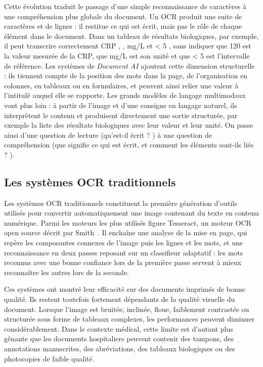 Cette évolution traduit le passage d'une simple reconnaissance de caractères à une compréhension plus globale du document. Un OCR produit une suite de caractères et de lignes : il restitue ce qui est écrit, mais pas le rôle de chaque élément dans le document. Dans un tableau de résultats biologiques, par exemple, il peut transcrire correctement \og CRP \fg{},  \fg{}, \og mg/L \fg{} et \og < 5 \fg{}, sans indiquer que 120 est la valeur mesurée de la CRP, que mg/L est son unité et que < 5 est l'intervalle de référence. Les systèmes de \textit{Document AI} ajoutent cette dimension structurelle : ils tiennent compte de la position des mots dans la page, de l'organisation en colonnes, en tableaux ou en formulaires, et peuvent ainsi relier une valeur à l'intitulé auquel elle se rapporte. Les grands modèles de langage multimodaux vont plus loin : à partir de l'image et d'une consigne en langage naturel, ils interprètent le contenu et produisent directement une sortie structurée, par exemple la liste des résultats biologiques avec leur valeur et leur unité. On passe ainsi d'une question de lecture (\og qu'est-il écrit ? \fg{}) à une question de compréhension (\og que signifie ce qui est écrit, et comment les éléments sont-ils liés ? \fg{}).

\subsection{Les systèmes OCR traditionnels}

Les systèmes OCR traditionnels constituent la première génération d'outils utilisés pour convertir automatiquement une image contenant du texte en contenu numérique. Parmi les moteurs les plus utilisés figure Tesseract, un moteur OCR open source décrit par Smith~\cite{smith2007tesseract}. Il enchaîne une analyse de la mise en page, qui repère les composantes connexes de l'image puis les lignes et les mots, et une reconnaissance en deux passes reposant sur un classifieur adaptatif : les mots reconnus avec une bonne confiance lors de la première passe servent à mieux reconnaître les autres lors de la seconde.

Ces systèmes ont montré leur efficacité sur des documents imprimés de bonne qualité. Ils restent toutefois fortement dépendants de la qualité visuelle du document. Lorsque l'image est bruitée, inclinée, floue, faiblement contrastée ou structurée sous forme de tableaux complexes, les performances peuvent diminuer considérablement. Dans le contexte médical, cette limite est d'autant plus gênante que les documents hospitaliers peuvent contenir des tampons, des annotations manuscrites, des abréviations, des tableaux biologiques ou des photocopies de faible qualité.


